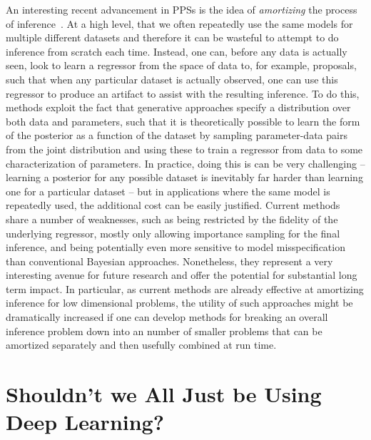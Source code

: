 An interesting recent advancement in PPSs is the idea of \emph{amortizing} the process of 
inference~\citep{paige2016inference,ritchie2016deep,le2017inference}.  At a high level, 
that we often repeatedly use the same models for multiple different datasets and therefore
it can be wasteful to attempt to do inference from scratch each time.  Instead, one can, before any data is
actually seen, look to learn a regressor from the space of data to, for example, proposals, such that
when any particular dataset is actually observed, one can use this regressor to produce an
artifact to assist with the resulting inference.  To do this, methods exploit the fact that generative
approaches specify a distribution over both data and parameters, such that it is theoretically possible
to learn the form of the posterior as a function of the dataset by sampling parameter-data pairs from
the joint distribution and using these to train a regressor from data to some characterization of
parameters.  In practice, doing this is can be very challenging -- learning a posterior for any possible
dataset is inevitably far harder than learning one for a particular dataset -- but in applications where
the same model is repeatedly used, the additional cost can be easily justified.  Current methods share
a number of weaknesses, such as being restricted by the fidelity of the underlying regressor, mostly
only allowing importance sampling for the final inference, and being potentially even more sensitive to
model misspecification than conventional Bayesian approaches.  Nonetheless, they represent a very interesting avenue
for future research and offer the potential for substantial long term impact.  In particular, as current methods
are already effective at amortizing inference for low dimensional problems, the utility of such approaches
might be dramatically increased if one can develop methods for breaking an overall inference problem down
into an number of smaller problems that can be amortized separately and then usefully combined at run time.

\section{Shouldn't we All Just be Using Deep Learning?}

